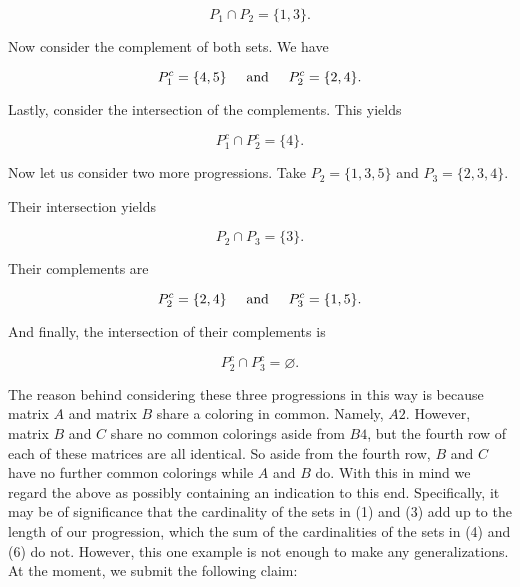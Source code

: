 \documentclass[12pt, a4paper]{article}
\begin{document}
\begin{equation}
    P_1\cap P_2=\{1, 3\}.
\end{equation}

\vspace{2mm}

\noindent Now consider the complement of both sets. We have

\begin{equation}
    P_1^c=\{4, 5\}\text{\hspace{5mm}and\hspace{5mm}}P_2^c=\{2, 4\}.
\end{equation}

\vspace{2mm}

\noindent Lastly, consider the intersection of the complements. This yields

\begin{equation}
    P_1^c\cap P_2^c=\{4\}.
\end{equation}

\vspace{2mm}

\noindent Now let us consider two more progressions. Take $P_2=\{1, 3, 5\}$ and $P_3=\{2, 3, 4\}$.\par\noindent Their intersection yields

\begin{equation}
    P_2\cap P_3 =\{3\}.
\end{equation}

\vspace{2mm} 

\noindent Their complements are

\begin{equation}
    P_2^c=\{2, 4\}\text{\hspace{5mm}and\hspace{5mm}}P_3^c=\{1, 5\}.
\end{equation}

\vspace{2mm}

\noindent And finally, the intersection of their complements is

\begin{equation}
    P_2^c\cap P_3^c=\varnothing.
\end{equation}

\vspace{2mm}

\noindent The reason behind considering these three progressions in this way is because matrix $A$ and matrix $B$ share a coloring in common. Namely, $A2$. However, matrix $B$ and $C$ share no common colorings aside from $B4$, but the fourth row of each of these matrices are all identical. So aside from the fourth row, $B$ and $C$ have no further common colorings while $A$ and $B$ do. With this in mind we regard the above as possibly containing an indication to this end. Specifically, it may be of significance that the cardinality of the sets in (1) and (3) add up to the length of our progression, which the sum of the cardinalities of the sets in (4) and (6) do not. However, this one example is not enough to make any generalizations. At the moment, we submit the following claim:
\end{document}
